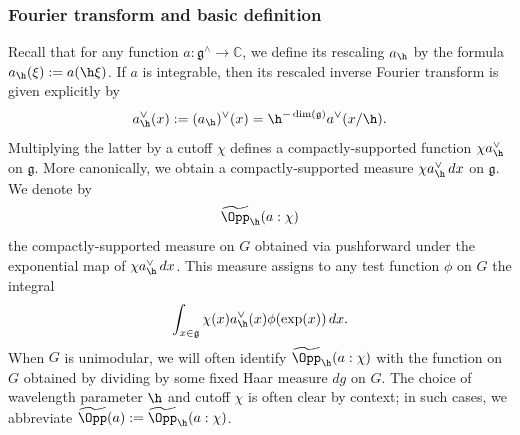 \subsubsection{Fourier transform and basic definition}\label{sec:four-transf-basic}
Recall that for any function $a : \mathfrak{g}^\wedge \rightarrow \mathbb{C}$, we define its rescaling $a_{\h}$ by the formula $a_{\h}(\xi) := a(\h \xi)$.  If $a$ is integrable, then its rescaled inverse Fourier transform is given explicitly by
\begin{equation*}
  a_{\h}^\vee(x)
  :=(a_{\h})^\vee(x)
  = \h^{-\dim(\mathfrak{g})} a^\vee(x/\h).
\end{equation*}
Multiplying the latter by a cutoff $\chi$ defines a compactly-supported function $\chi a_{\h}^\vee$ on $\mathfrak{g}$.  More canonically, we obtain a compactly-supported measure $\chi a_{\h}^\vee \, d x$ on $\mathfrak{g}$.  We denote by 
\begin{equation*}
  \widetilde{\Opp}_{\h}(a:\chi)
\end{equation*}
the compactly-supported measure on $G$ obtained via pushforward under the exponential map of $\chi a_{\h}^\vee \, d x$.  This measure assigns to any test function $\phi$ on $G$ the integral
\begin{equation*}
  \int_{x \in \mathfrak{g} } \chi(x) a_{\h}^\vee(x) \phi(\exp(x)) \, d x.
\end{equation*}
When $G$ is unimodular, we will often identify $\widetilde{\Opp}_{\h}(a:\chi)$ with the function on $G$ obtained by dividing by some fixed Haar measure $d g$ on $G$.    The choice of wavelength parameter $\h$ and cutoff $\chi$ is often clear by context; in such cases, we abbreviate $\widetilde{\Opp}(a) := \widetilde{\Opp}_{\h}(a:\chi)$.

